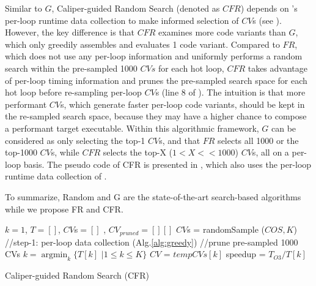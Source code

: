 Similar to $G$, Caliper-guided Random Search (denoted as $CFR$)
depends on \toolname's per-loop runtime data collection to make
informed selection of $CV$s (see ).  However, the
key difference is that $CFR$ examines more code variants than $G$,
which only greedily assembles and evaluates 1 code variant.  Compared
to $FR$, which does not use any per-loop information and uniformly
performs a random search within the pre-sampled 1000 $CVs$ for each
hot loop, $CFR$ takes advantage of per-loop timing information and
prunes the pre-sampled search space for each hot loop before
re-sampling per-loop $CV$s (line 8 of ).  The
intuition is that more performant $CV$s, which generate faster
per-loop code variants, should be kept in the re-sampled search space,
because they may have a higher chance to compose a performant target
executable.  Within this algorithmic framework, $G$ can be
considered as only selecting the top-1 $CV$s, and that $FR$ selects
all 1000 or the top-1000 $CV$s, while $CFR$ selects the top-X
($1<X<<1000$) $CV$s, all on a per-loop basis.  The pseudo code of CFR
is presented in , which also uses the \toolname per-loop
runtime data collection of .

To summarize, Random and G are the state-of-the-art search-based
algorithms while we propose FR and CFR.

\begin{algorithm}[t]
\DontPrintSemicolon
\SetAlgoLined
{}
\BlankLine
$k = 1$, $T= [ ]$, $CV$s$ = []$ , $CV_{pruned} = [][]$\;
$CV$s = randomSample ($COS, K$)\;
//step-1: \toolname per-loop data collection (Alg.\ref{alg:greedy})\;
\vspace{.5em}
//prune pre-sampled 1000 CVs\;
$k = \operatorname*{argmin}_k {\{T[k]}$ ${ | 1\leq{k}\leq{K}\}}$ \;
$CV$ = $tempCVs[k]$\;
speedup = $T_{O3}/T[k]$ \;
\caption{Caliper-guided Random Search (CFR)}
\label{alg:cfr}

\end{algorithm}
